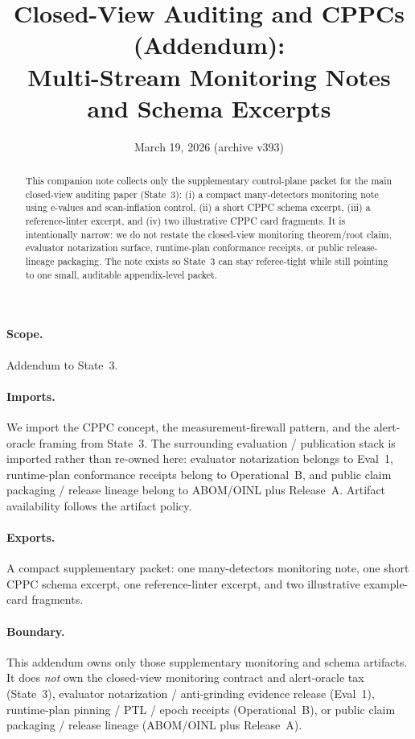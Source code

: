 \documentclass[11pt]{article}
\title{Closed-View Auditing and CPPCs (Addendum):\\Multi-Stream Monitoring Notes and Schema Excerpts}
\author{}
\date{March 19, 2026 (archive v393)}
\theoremstyle{definition}
\theoremstyle{remark}
\begin{document}
\maketitle

\begin{abstract}
This companion note collects only the supplementary control-plane packet for the main closed-view auditing paper (State~3):
(i) a compact many-detectors monitoring note using e-values and scan-inflation control,
(ii) a short CPPC schema excerpt,
(iii) a reference-linter excerpt, and
(iv) two illustrative CPPC card fragments.
It is intentionally narrow: we do not restate the closed-view monitoring theorem/root claim, evaluator notarization surface, runtime-plan conformance receipts, or public release-lineage packaging.
The note exists so State~3 can stay referee-tight while still pointing to one small, auditable appendix-level packet.
\end{abstract}

\paragraph{Scope.}
Addendum to State~3.\cite{series:state3}

\paragraph{Imports.}
We import the CPPC concept, the measurement-firewall pattern, and the alert-oracle framing from State~3.\cite{series:state3}
The surrounding evaluation / publication stack is imported rather than re-owned here: evaluator notarization belongs to Eval~1, runtime-plan conformance receipts belong to Operational~B, and public claim packaging / release lineage belong to ABOM/OINL plus Release~A.\cite{series:evalnotary,series:opB,series:abomoinl,series:releaseproperty}
Artifact availability follows the artifact policy.\cite{series:artifactpolicy}

\paragraph{Exports.}
A compact supplementary packet: one many-detectors monitoring note, one short CPPC schema excerpt, one reference-linter excerpt, and two illustrative example-card fragments.

\paragraph{Boundary.}
This addendum owns only those supplementary monitoring and schema artifacts.
It does \emph{not} own the closed-view monitoring contract and alert-oracle tax (State~3), evaluator notarization / anti-grinding evidence release (Eval~1), runtime-plan pinning / PTL / epoch receipts (Operational~B), or public claim packaging / release lineage (ABOM/OINL plus Release~A).\cite{series:state3,series:evalnotary,series:opB,series:abomoinl,series:releaseproperty}
\end{document}
